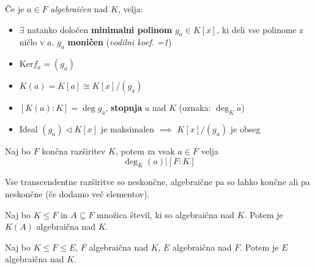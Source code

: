 Če je $a \in F$ \emph{algebraičen} nad $K$, velja:
\begin{itemize}
	\item $\exists$ natanko določen \textbf{minimalni polinom} $g_a \in K[x]$, ki deli vse polinome z ničlo v $a$.  $g_a$ \textbf{moničen} (\emph{vodilni koef. =1})
	\item $\text{Ker}f_a = (g_a)$
	\item $K(a) = K[a] \cong K[x] / (g_a)$
	\item $[K(a):K] = \deg g_a$, \textbf{stopnja} $a$ nad $K$ (oznaka: $\deg_K a$)
	\item Ideal $(g_a) \lhd K[x]$ je maksimalen $\implies$ $K[x] / (g_a)$ je obseg
\end{itemize}

Naj bo $F$ končna razširitev $K$, potem za vsak $a \in F$ velja 
\[\deg_K (a) \big| [F:K] \]

Vse transcendentne razširitve so neskončne, algebraične pa so lahko končne ali pa neskončne (če dodamo več elementov).

Naj bo $K \leq F$ in $A \subseteq F$ množica števil, ki so algebraična nad $K$. Potem je $K(A)$ algebraična nad $K$.

Naj bo $K \leq F \leq E$, $F$ algebraična nad $K$, $E$ algebraična nad $F$. Potem je $E$ algebraična nad $K$.
